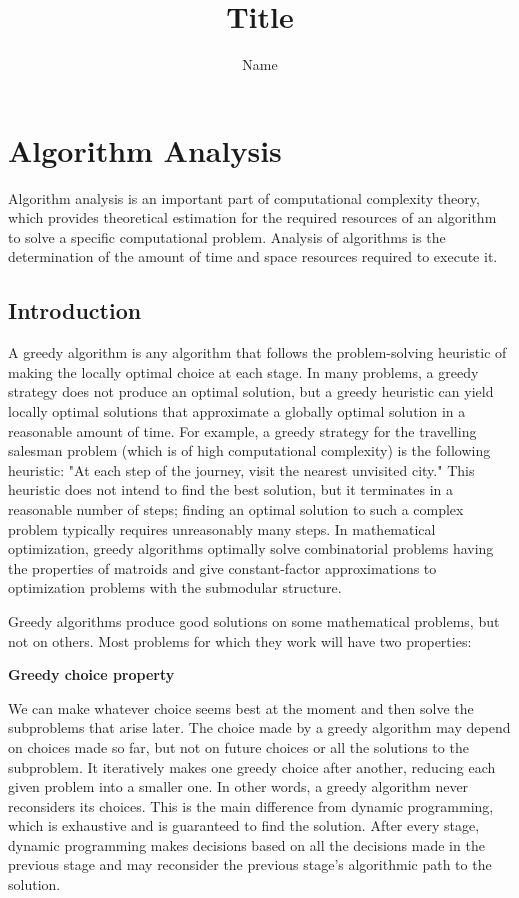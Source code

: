 \documentclass[a4paper, 12pt]{article}
\author{Name}
\title{Title}
\begin{document}

\tableofcontents
\newpage

\section{Algorithm Analysis}

Algorithm analysis is an important part of computational complexity theory, which provides
theoretical estimation for the required resources of an algorithm to solve a specific computational problem. Analysis of algorithms is the determination of the amount of time and space
resources required to execute it.

\subsection{Introduction}

A greedy algorithm is any algorithm that follows the problem-solving heuristic of making the locally optimal choice at each stage.  In many problems, a greedy strategy does not produce an optimal solution, but a greedy heuristic can yield locally optimal solutions that approximate a globally optimal solution in a reasonable amount of time.
For example, a greedy strategy for the travelling salesman problem (which is of high computational complexity) is the following heuristic: "At each step of the journey, visit the nearest unvisited city." This heuristic does not intend to find the best solution, but it terminates in a reasonable number of steps; finding an optimal solution to such a complex problem typically requires unreasonably many steps. In mathematical optimization, greedy algorithms optimally solve combinatorial problems having the properties of matroids and give constant-factor approximations to optimization problems with the submodular structure.

Greedy algorithms produce good solutions on some mathematical problems, but not on others. Most problems for which they work will have two properties:

\textbf{Greedy choice property}

We can make whatever choice seems best at the moment and then solve the subproblems that arise later. The choice made by a greedy algorithm may depend on choices made so far, but not on future choices or all the solutions to the subproblem. It iteratively makes one greedy choice after another, reducing each given problem into a smaller one. In other words, a greedy algorithm never reconsiders its choices. This is the main difference from dynamic programming, which is exhaustive and is guaranteed to find the solution. After every stage, dynamic programming makes decisions based on all the decisions made in the previous stage and may reconsider the previous stage's algorithmic path to the solution.
\end{document}
